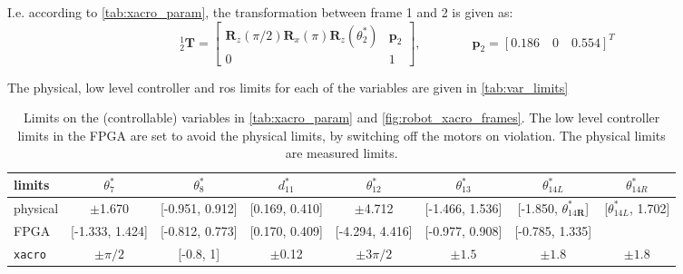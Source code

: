 I.e. according to \autoref{tab:xacro_param}, the transformation between frame 1 and 2 is given as:
\begin{equation}
^1_2\mathbf{T} = 
\begin{bmatrix}
\textbf{R}_z(\pi/2)\textbf{R}_x(\pi)\textbf{R}_z(\theta_2^*) & \mathbf{p}_2\\
0 & 1
\end{bmatrix}, \qquad\qquad
\mathbf{p}_2 = [0.186 \quad 0 \quad 0.554]^T
\end{equation}

The physical, low level controller and \gls{ros} limits for each of the variables are given in \autoref{tab:var_limits}

\vspace{2mm}
\begin{table}[htbp]
\small
\hspace*{-9mm}
\begin{tabular}{l | ccccccc}\hline
limits & $\theta_7^*$ & $\theta_8^*$ & $d_{11}^*$ & $\theta_{12}^*$ & $\theta_{13}^*$ & $\theta_{14L}^*$ & $\theta_{14R}^*$ \\\hline
physical & $\pm$1.670 & [-0.951, 0.912] & [0.169, 0.410] & $\pm$4.712 & [-1.466, 1.536] & [-1.850, $\theta_{14\textbf{R}}^*$] & [$\theta_{14L}^*$, 1.702] \\
FPGA & [-1.333, 1.424] & [-0.812, 0.773] & [0.170, 0.409] & [-4.294, 4.416] & [-0.977, 0.908] & [-0.785, 1.335] & \\
\texttt{xacro} & $\pm\pi/2$ & [-0.8, 1] & $\pm$0.12 & $\pm3\pi/2$ & $\pm 1.5$ & $\pm 1.8$ & $\pm 1.8$
\end{tabular}
\normalsize
\caption{Limits on the (controllable) variables in \autoref{tab:xacro_param} and \autoref{fig:robot_xacro_frames}. The low level controller limits in the FPGA are set to avoid the physical limits, by switching off the motors on violation. The physical limits are measured limits.}
\label{tab:var_limits}
\end{table}
\vspace{2mm}

